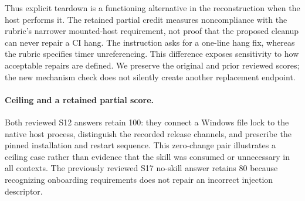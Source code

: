 \documentclass[11pt]{article}
\begin{document}
Thus explicit teardown is a functioning alternative in the reconstruction when the host performs it. The retained partial credit measures noncompliance with the rubric's narrower mounted-host requirement, not proof that the proposed cleanup can never repair a CI hang. The instruction asks for a one-line hang fix, whereas the rubric specifies timer unreferencing. This difference exposes sensitivity to how acceptable repairs are defined. We preserve the original and prior reviewed scores; the new mechanism check does not silently create another replacement endpoint.

\paragraph{Ceiling and a retained partial score.}
Both reviewed S12 answers retain 100: they connect a Windows file lock to the native host process, distinguish the recorded release channels, and prescribe the pinned installation and restart sequence. This zero-change pair illustrates a ceiling case rather than evidence that the skill was consumed or unnecessary in all contexts. The previously reviewed S17 no-skill answer retains 80 because recognizing onboarding requirements does not repair an incorrect injection descriptor.
\end{document}
